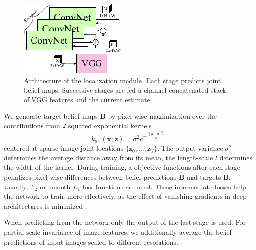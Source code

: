 \documentclass[conference]{IEEEtran}
\begin{document}
    \begin{figure} [!h]
        \centering
        \includegraphics[width=0.7\columnwidth]{figures/joint_model/joint_model.pdf}
        \caption {
            \label{fig:jointmodel} 
            Architecture of the localization module. Each stage predicts joint belief maps. Successive stages are fed a channel concatenated stack of VGG features and the current estimate.
        }
    \end{figure}

    We generate target belief maps $\mathbf{B}$ by pixel-wise maximization over the contributions from $J$ squared exponential kernels
    \begin{equation}
        k_{\textrm{SE}}(\mathbf{x};\mathbf{z}) = \sigma^2e^{-\frac{\lVert \mathbf{x} - \mathbf{z} \rVert^2_2}{l^2}}
    \end{equation}
    centered at sparse image joint locations $\{\mathbf{z}_0,\ldots,\mathbf{z}_J\}$. The output variance $\sigma^2$ determines the average distance away from its mean, the length-scale $l$ determines the width of the kernel. During training, a objective functions after each stage penalizes pixel-wise differences between belief predictions $\hat{\mathbf{B}}$ and targets $\mathbf{B}$. Usually, $L_2$ or smooth $L_1$ loss functions are used. These intermediate losses help the network to train more effectively, as the effect of vanishing gradients in deep architectures is minimized \cite{newell2016stacked, wei2016convolutional}. 
    
    When predicting from the network only the output of the last stage is used. For partial scale invariance of image features, we additionally average the belief predictions of input images scaled to different resolutions.
\end{document}
